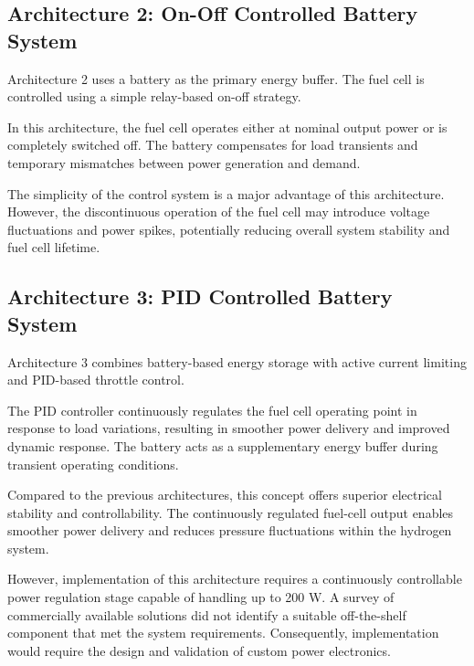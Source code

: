 \subsection*{Architecture 2: On-Off Controlled Battery System}

Architecture 2 uses a battery as the primary energy buffer. The fuel cell is controlled using a simple relay-based on-off strategy.

In this architecture, the fuel cell operates either at nominal output power or is completely switched off. The battery compensates for load transients and temporary mismatches between power generation and demand.

The simplicity of the control system is a major advantage of this architecture. However, the discontinuous operation of the fuel cell may introduce voltage fluctuations and power spikes, potentially reducing overall system stability and fuel cell lifetime.

\subsection*{Architecture 3: PID Controlled Battery System}

Architecture 3 combines battery-based energy storage with active current limiting and PID-based throttle control.

The PID controller continuously regulates the fuel cell operating point in response to load variations, resulting in smoother power delivery and improved dynamic response. The battery acts as a supplementary energy buffer during transient operating conditions.

Compared to the previous architectures, this concept offers superior electrical stability and controllability. The continuously regulated fuel-cell output enables smoother power delivery and reduces pressure fluctuations within the hydrogen system.

However, implementation of this architecture requires a continuously controllable power regulation stage capable of handling up to 200 W. A survey of commercially available solutions did not identify a suitable off-the-shelf component that met the system requirements. Consequently, implementation would require the design and validation of custom power electronics.

